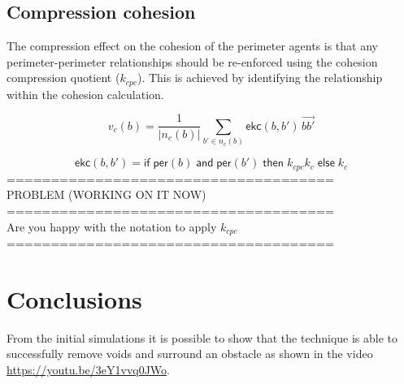 \documentclass[12pt,a4paper]{article}
\begin{document}
\subsection{Compression cohesion}
The compression effect on the cohesion of the perimeter agents is that any perimeter-perimeter relationships should be re-enforced using the cohesion compression quotient ($k_{cpc}$). This is achieved by identifying the relationship within the cohesion calculation.

\begin{equation}\label{eq:cohesion3}
v_c(b) = \frac{1}{\lvert n_c(b)\rvert} \sum_{b' \in n_c(b)}\mathsf{ekc}(b, b')\, \vec{b b'}
\end{equation}

\begin{equation}\label{eq:cohesion4}
\mathsf{ekc}(b, b') = \mathsf{if} \; \mathsf{per}(b) \; \mathsf{and} \; \mathsf{per}(b') \; \mathsf{then} \; k_{cpc}k_c \; \mathsf{else} \; k_c
\end{equation}
=====================================\\
PROBLEM (WORKING ON IT NOW)\\
=====================================\\
Are you happy with the notation to apply $k_{cpc}$\\
=====================================\\

\section{Conclusions}\label{conclusions}
From the initial simulations it is possible to show that the technique is able to successfully remove voids and surround an obstacle as shown in the video \href{https://youtu.be/3eY1vvq0JWo}{https://youtu.be/3eY1vvq0JWo}.



\end{document}
